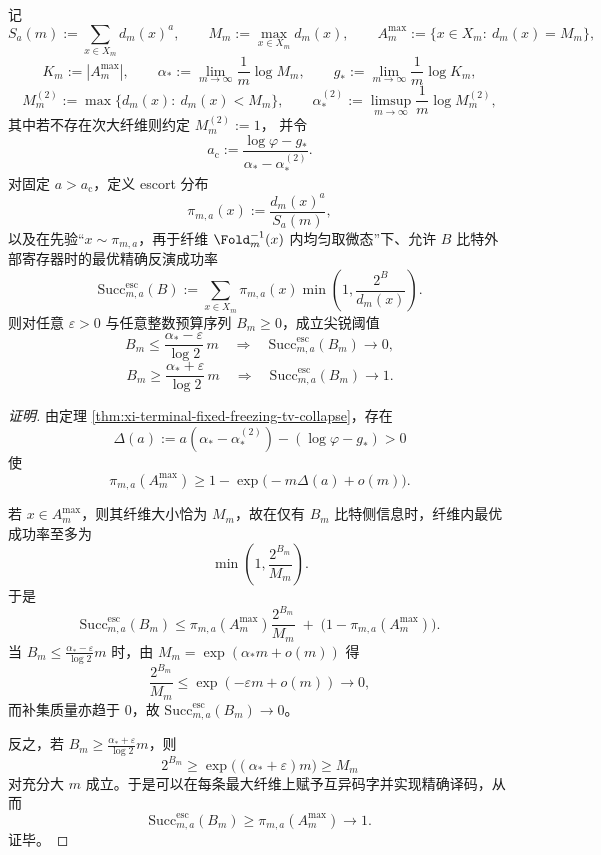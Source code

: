 \begin{conclusion}[固定冻结相中精确微态反演的尖锐比特阈值]\label{con:xi-terminal-fixed-freezing-escort-oracle-sharp-threshold}
记
\[
S_a(m):=\sum_{x\in X_m}d_m(x)^a,\qquad
M_m:=\max_{x\in X_m}d_m(x),\qquad
A_m^{\max}:=\{x\in X_m:\ d_m(x)=M_m\},
\]
\[
K_m:=|A_m^{\max}|,\qquad
\alpha_*:=\lim_{m\to\infty}\frac{1}{m}\log M_m,\qquad
g_*:=\lim_{m\to\infty}\frac{1}{m}\log K_m,
\]
\[
M_m^{(2)}:=\max\{d_m(x):\ d_m(x)<M_m\},\qquad
\alpha_*^{(2)}:=\limsup_{m\to\infty}\frac{1}{m}\log M_m^{(2)},
\]
其中若不存在次大纤维则约定 \(M_m^{(2)}:=1\)，
并令
\[
a_{\mathrm c}:=\frac{\log\varphi-g_*}{\alpha_*-\alpha_*^{(2)}}.
\]
对固定 \(a>a_{\mathrm c}\)，定义 escort 分布
\[
\pi_{m,a}(x):=\frac{d_m(x)^a}{S_a(m)},
\]
以及在先验“\(x\sim \pi_{m,a}\)，再于纤维 \(\Fold_m^{-1}(x)\) 内均匀取微态”下、允许 \(B\) 比特外部寄存器时的最优精确反演成功率
\[
\mathrm{Succ}^{\mathrm{esc}}_{m,a}(B)
:=
\sum_{x\in X_m}\pi_{m,a}(x)\min\!\left(1,\frac{2^B}{d_m(x)}\right).
\]
则对任意 \(\varepsilon>0\) 与任意整数预算序列 \(B_m\ge 0\)，成立尖锐阈值
\[
B_m\le \frac{\alpha_*-\varepsilon}{\log 2}\,m
\quad\Longrightarrow\quad
\mathrm{Succ}^{\mathrm{esc}}_{m,a}(B_m)\longrightarrow 0,
\]
\[
B_m\ge \frac{\alpha_*+\varepsilon}{\log 2}\,m
\quad\Longrightarrow\quad
\mathrm{Succ}^{\mathrm{esc}}_{m,a}(B_m)\longrightarrow 1.
\]
\end{conclusion}
\begin{proof}[证明]
由定理 \ref{thm:xi-terminal-fixed-freezing-tv-collapse}，存在
\[
\Delta(a):=a(\alpha_*-\alpha_*^{(2)})-(\log\varphi-g_*)>0
\]
使
\[
\pi_{m,a}(A_m^{\max})
\ge
1-\exp\!\bigl(-m\Delta(a)+o(m)\bigr).
\]

若 \(x\in A_m^{\max}\)，则其纤维大小恰为 \(M_m\)，故在仅有 \(B_m\) 比特侧信息时，纤维内最优成功率至多为
\[
\min\!\left(1,\frac{2^{B_m}}{M_m}\right).
\]
于是
\[
\mathrm{Succ}^{\mathrm{esc}}_{m,a}(B_m)
\le
\pi_{m,a}(A_m^{\max})\frac{2^{B_m}}{M_m}
\;+\;
\bigl(1-\pi_{m,a}(A_m^{\max})\bigr).
\]
当
\(
B_m\le \frac{\alpha_*-\varepsilon}{\log 2}m
\)
时，由 \(M_m=\exp(\alpha_*m+o(m))\) 得
\[
\frac{2^{B_m}}{M_m}\le \exp(-\varepsilon m+o(m))\longrightarrow 0,
\]
而补集质量亦趋于 \(0\)，故 \(\mathrm{Succ}^{\mathrm{esc}}_{m,a}(B_m)\to 0\)。

反之，若
\(
B_m\ge \frac{\alpha_*+\varepsilon}{\log 2}m
\)，则
\[
2^{B_m}\ge \exp\!\bigl((\alpha_*+\varepsilon)m\bigr)\ge M_m
\]
对充分大 \(m\) 成立。于是可以在每条最大纤维上赋予互异码字并实现精确译码，从而
\[
\mathrm{Succ}^{\mathrm{esc}}_{m,a}(B_m)\ge \pi_{m,a}(A_m^{\max})\longrightarrow 1.
\]
证毕。
\end{proof}

